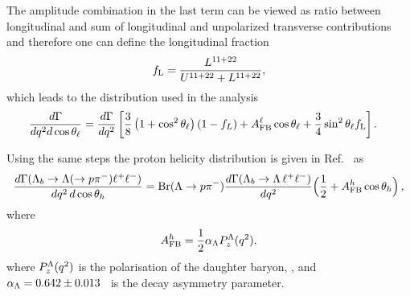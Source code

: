 The amplitude combination in the last term can be viewed as ratio between longitudinal and sum of
longitudinal and unpolarized transverse contributions and therefore one can define the longitudinal fraction
\begin{equation}
f_{\rm L}=\frac{L^{11+22}}{U^{11+22}+L^{11+22}},
\end{equation}
which leads to the distribution used in the analysis
\begin{align}
\frac{d\Gamma}{dq^2d\cos\theta_\ell}=
\frac{d\Gamma}{dq^2}&\left[  \frac{3}{8}\left(1+\cos^2\theta_\ell\right)(1-f_L)+A_{\rm FB}^\ell\cos\theta_\ell +
   \frac{3}{4}\sin^2\theta_\ell f_{\rm L}\right]. 
   \label{eq:afbLTh}
\end{align}

Using the same steps the proton helicity distribution is given in Ref.~\cite{Gutsche:2013pp} as
\begin{equation}
\frac{d\Gamma(\Lambda_{b}\to \Lambda(\to p \pi^{-})\ell^{+}\ell^{-})}
     {dq^2\,d\cos\theta_h} 
={\rm Br}(\Lambda \to p\pi^{-})
 \frac{d\Gamma(\Lambda_b \to \Lambda\, \ell^{+}\ell^{-})}{d q^2}
\Big(\frac{1}{2}+A_{\rm FB}^h\cos\theta_h\Big) \,,
\label{eq:afbBTh}
\end{equation}
where 
\begin{equation}
A_{\rm FB}^h=\frac{1}{2}\alpha_{\Lambda}P_z^\Lambda(q^2).
\end{equation} 
where $P_z^\Lambda(q^2)$ is the polarisation of the daughter baryon, \Lz,
and $\alpha_{\Lambda} = 0.642 \pm 0.013$~\cite{PDG2014} is the \Lz decay asymmetry parameter.



